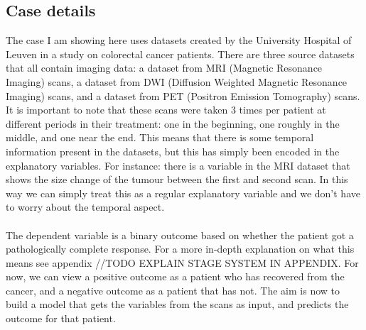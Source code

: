 \subsection{Case details}
\label{sec:evaluation-casedetails}
The case I am showing here uses datasets created by the University Hospital of Leuven in a study on colorectal cancer patients. There are three source datasets that all contain imaging data: a dataset from MRI (Magnetic Resonance Imaging) scans, a dataset from DWI (Diffusion Weighted Magnetic Resonance Imaging) scans, and a dataset from PET (Positron Emission Tomography) scans. It is important to note that these scans were taken 3 times per patient at different periods in their treatment: one in the beginning, one roughly in the middle, and one near the end. This means that there is some temporal information present in the datasets, but this has simply been encoded in the explanatory variables. For instance: there is a variable in the MRI dataset that shows the size change of the tumour between the first and second scan. In this way we can simply treat this as a regular explanatory variable and we don't have to worry about the temporal aspect. \\ \\
The dependent variable is a binary outcome based on whether the patient got a pathologically complete response. For a more in-depth explanation on what this means see appendix //TODO EXPLAIN STAGE SYSTEM IN APPENDIX. For now, we can view a positive outcome as a patient who has recovered from the cancer, and a negative outcome as a patient that has not. The aim is now to build a model that gets the variables from the scans as input, and predicts the outcome for that patient.
